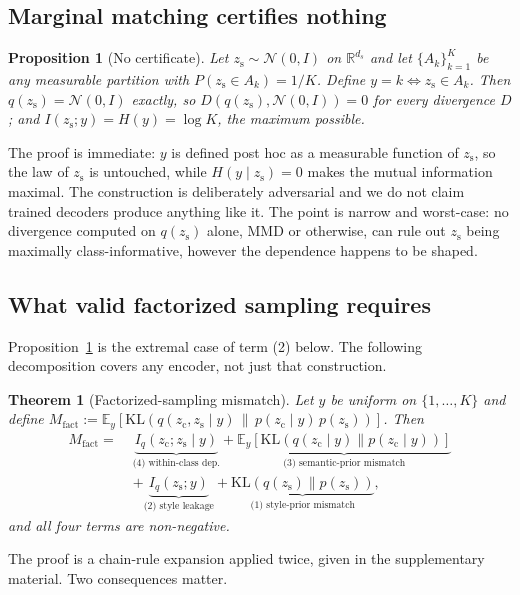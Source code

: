 \documentclass[letterpaper]{article} %
\newtheorem{theorem}{Theorem}
\newtheorem{proposition}{Proposition}
\newcommand{\zc}{z_{\mathrm{c}}}
\newcommand{\zs}{z_{\mathrm{s}}}
\newcommand{\R}{\mathbb{R}}
\newcommand{\KL}{\mathrm{KL}}
\begin{document}
\subsection{Marginal matching certifies nothing}

\begin{proposition}[No certificate]
\label{prop:nocert}
Let $\zs\sim\mathcal N(0,I)$ on $\R^{d_s}$ and let $\{A_k\}_{k=1}^K$ be any
measurable partition with $P(\zs\in A_k)=1/K$. Define $y=k \iff \zs\in A_k$.
Then $q(\zs)=\mathcal N(0,I)$ exactly, so $D(q(\zs),\mathcal N(0,I))=0$ for
\emph{every} divergence $D$; and $I(\zs;y)=H(y)=\log K$, the maximum
possible.
\end{proposition}

The proof is immediate: $y$ is defined post hoc as a measurable function of
$\zs$, so the law of $\zs$ is untouched, while $H(y\mid\zs)=0$ makes the
mutual information maximal. The construction is deliberately adversarial and
we do not claim trained decoders produce anything like it. The point is
narrow and worst-case: no divergence computed on $q(\zs)$ alone, MMD or
otherwise, can rule out $\zs$ being maximally class-informative, however the
dependence happens to be shaped.

\subsection{What valid factorized sampling requires}

Proposition~\ref{prop:nocert} is the extremal case of term (2) below. The
following decomposition covers any encoder, not just that construction.

\begin{theorem}[Factorized-sampling mismatch]
\label{thm:decomp}
Let $y$ be uniform on $\{1,\dots,K\}$ and define
$M_{\mathrm{fact}} := \mathbb E_y[\KL(q(\zc,\zs\mid y)\,\|\,p(\zc\mid
y)\,p(\zs))]$. Then
\begin{align*}
M_{\mathrm{fact}} =\;& \underbrace{I_q(\zc;\zs\mid y)}_{\text{(4) within-class dep.}}
 + \underbrace{\mathbb E_y[\KL(q(\zc\mid y)\|p(\zc\mid y))]}_{\text{(3) semantic-prior mismatch}}\\
 &+ \underbrace{I_q(\zs;y)}_{\text{(2) style leakage}}
 + \underbrace{\KL(q(\zs)\|p(\zs))}_{\text{(1) style-prior mismatch}},
\end{align*}
and all four terms are non-negative.
\end{theorem}

The proof is a chain-rule expansion applied twice, given in the
supplementary material. Two consequences matter.
\end{document}
